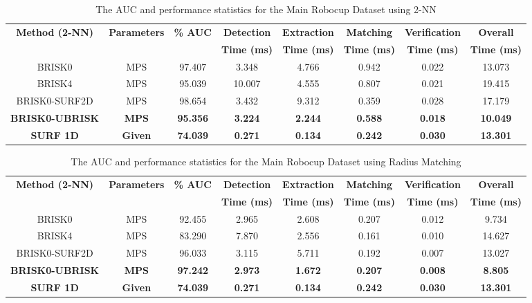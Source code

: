 \documentclass[11pt]{report}
\begin{document}
\begin{table}
\caption{The AUC and performance statistics for the Main Robocup Dataset using
2-NN}
\footnotesize
\begin{tabular}{|c|c|c|c|c|c|c|c|}
\hline 
\textbf{Method (2-NN)} & \textbf{Parameters} & \textbf{\% AUC} & \textbf{Detection} & \textbf{Extraction} & \textbf{Matching} & \textbf{Verification} & \textbf{Overall}\tabularnewline
 &  &  & \textbf{Time (ms)} & \textbf{Time (ms)} & \textbf{Time (ms)} & \textbf{Time (ms)} & \textbf{Time (ms)}\tabularnewline
\hline 
\hline 
BRISK0 & MPS & 97.407 & 3.348 & 4.766 & 0.942 & 0.022 & 13.073\tabularnewline
\hline 
BRISK4 & MPS & 95.039 & 10.007 & 4.555 & 0.807 & 0.021 & 19.415\tabularnewline
\hline 
BRISK0-SURF2D & MPS & 98.654 & 3.432 & 9.312 & 0.359 & 0.028 & 17.179\tabularnewline
\hline 
\textbf{BRISK0-UBRISK} & \textbf{MPS} & \textbf{95.356} & \textbf{3.224} & \textbf{2.244} & \textbf{0.588} & \textbf{0.018} & \textbf{10.049}\tabularnewline
\hline 
\textbf{SURF 1D} & \textbf{Given} & \textbf{74.039} & \textbf{0.271} & \textbf{0.134} & \textbf{0.242} & \textbf{0.030} & \textbf{13.301}\tabularnewline
\hline 
\end{tabular}
\label{sec:mrd_times_knn}
\end{table}

\begin{table}
\caption{The AUC and performance statistics for the Main Robocup Dataset using
Radius Matching}
\footnotesize
\begin{tabular}{|c|c|c|c|c|c|c|c|}
\hline 
\textbf{Method (2-NN)} & \textbf{Parameters} & \textbf{\% AUC} & \textbf{Detection} & \textbf{Extraction} & \textbf{Matching} & \textbf{Verification} & \textbf{Overall}\tabularnewline
 &  &  & \textbf{Time (ms)} & \textbf{Time (ms)} & \textbf{Time (ms)} & \textbf{Time (ms)} & \textbf{Time (ms)}\tabularnewline
\hline 
\hline 
BRISK0 & MPS & 92.455 & 2.965 & 2.608 & 0.207 & 0.012 & 9.734\tabularnewline
\hline 
BRISK4 & MPS & 83.290 & 7.870 & 2.556 & 0.161 & 0.010 & 14.627\tabularnewline
\hline 
BRISK0-SURF2D & MPS & 96.033 & 3.115 & 5.711 & 0.192 & 0.007 & 13.027\tabularnewline
\hline 
\textbf{BRISK0-UBRISK} & \textbf{MPS} & \textbf{97.242} & \textbf{2.973} & \textbf{1.672} & \textbf{0.207} & \textbf{0.008} & \textbf{8.805}\tabularnewline
\hline 
\textbf{SURF 1D} & \textbf{Given} & \textbf{74.039} & \textbf{0.271} & \textbf{0.134} & \textbf{0.242} & \textbf{0.030} & \textbf{13.301}\tabularnewline
\hline 
\end{tabular}
\label{tab:mrd_times_hamming}
\end{table}
\end{document}

